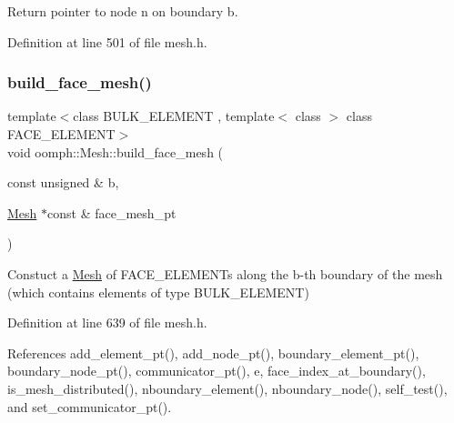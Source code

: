 Return pointer to node n on boundary b. 



Definition at line 501 of file mesh.\+h.

\mbox{\label{classoomph_1_1Mesh_a93e1758501aeea3328291571ce501029}} 
\subsubsection{\texorpdfstring{build\+\_\+face\+\_\+mesh()}{build\_face\_mesh()}}
{\footnotesize\ttfamily template$<$class B\+U\+L\+K\+\_\+\+E\+L\+E\+M\+E\+NT , template$<$ class $>$ class F\+A\+C\+E\+\_\+\+E\+L\+E\+M\+E\+NT$>$ \\
void oomph\+::\+Mesh\+::build\+\_\+face\+\_\+mesh (\begin{DoxyParamCaption}\item[{const unsigned \&}]{b,  }\item[{\hyperlink{classoomph_1_1Mesh}{Mesh} $\ast$const \&}]{face\+\_\+mesh\+\_\+pt }\end{DoxyParamCaption})\hspace{0.3cm}{\ttfamily [inline]}}



Constuct a \hyperlink{classoomph_1_1Mesh}{Mesh} of F\+A\+C\+E\+\_\+\+E\+L\+E\+M\+E\+N\+Ts along the b-\/th boundary of the mesh (which contains elements of type B\+U\+L\+K\+\_\+\+E\+L\+E\+M\+E\+NT) 



Definition at line 639 of file mesh.\+h.



References add\+\_\+element\+\_\+pt(), add\+\_\+node\+\_\+pt(), boundary\+\_\+element\+\_\+pt(), boundary\+\_\+node\+\_\+pt(), communicator\+\_\+pt(), e, face\+\_\+index\+\_\+at\+\_\+boundary(), is\+\_\+mesh\+\_\+distributed(), nboundary\+\_\+element(), nboundary\+\_\+node(), self\+\_\+test(), and set\+\_\+communicator\+\_\+pt().

\mbox{\label{classoomph_1_1Mesh_a823b11b11e6a0c3c22ea86dc60a3da65}} 
